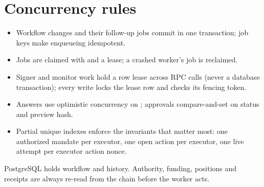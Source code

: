 \section{Concurrency rules}

\begin{itemize}
  \item Workflow changes and their follow-up jobs commit in one transaction; job keys make enqueueing idempotent.
  \item Jobs are claimed with  and a lease; a crashed worker's job is reclaimed.
  \item Signer and monitor work hold a row lease across RPC calls (never a database transaction); every write locks the lease row and checks its fencing token.
  \item Answers use optimistic concurrency on ; approvals compare-and-set on status and preview hash.
  \item Partial unique indexes enforce the invariants that matter most: one authorized mandate per executor, one open action per executor, one live attempt per executor action nonce.
\end{itemize}

\begin{note}
PostgreSQL holds workflow and history. Authority, funding, positions and receipts are always re-read from the chain before the worker acts.
\end{note}
